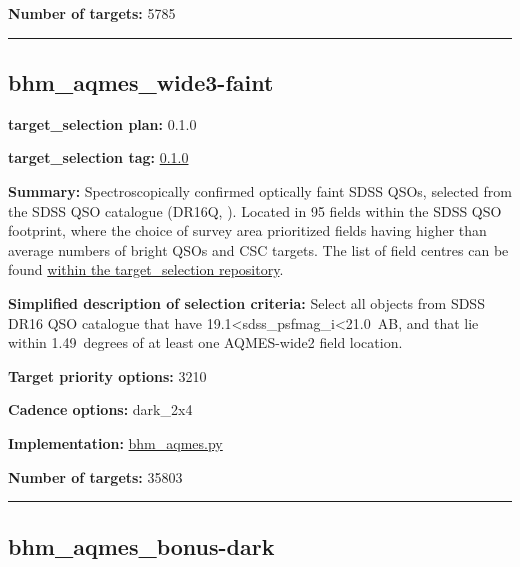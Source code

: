 \noindent\textbf{Number of targets:} 5785

\begin{center}\rule{0.5\linewidth}{0.5pt}\end{center}

\hypertarget{bhm_aqmes_wide3-faint_plan0.1.0}{%
\subsection{bhm\_aqmes\_wide3-faint}\label{bhm_aqmes_wide3-faint_plan0.1.0}}

\noindent\textbf{target\_selection plan:} 0.1.0

\noindent\textbf{target\_selection tag:}
\href{https://github.com/sdss/target_selection/tree/0.1.0/}{0.1.0}

\noindent\textbf{Summary:} Spectroscopically confirmed optically faint SDSS QSOs,
selected from the SDSS QSO catalogue (DR16Q,
\citealt{Lyke2020}). Located in 95 fields within the SDSS QSO footprint,
where the choice of survey area prioritized fields having higher than
average numbers of bright QSOs and CSC targets. The list of field
centres can be found
\href{https://github.com/sdss/target_selection/blob/0.1.0/python/target_selection/masks/candidate_target_fields_bhm_aqmes_wide_v0.2.1.fits}{within
the target\_selection repository}.

\noindent\textbf{Simplified description of selection criteria:} Select all
objects from SDSS DR16 QSO catalogue that have
19.1\textless sdss\_psfmag\_i\textless21.0~AB, and that lie within
1.49~degrees of at least one AQMES-wide2 field location.


\noindent\textbf{Target priority options:} 3210

\noindent\textbf{Cadence options:} dark\_2x4

\noindent\textbf{Implementation:}
\href{https://github.com/sdss/target_selection/blob/0.1.0/python/target_selection/cartons/bhm_aqmes.py}{bhm\_aqmes.py}

\noindent\textbf{Number of targets:} 35803

\begin{center}\rule{0.5\linewidth}{0.5pt}\end{center}

\hypertarget{bhm_aqmes_bonus-dark_plan0.1.0}{%
\subsection{bhm\_aqmes\_bonus-dark}\label{bhm_aqmes_bonus-dark_plan0.1.0}}

